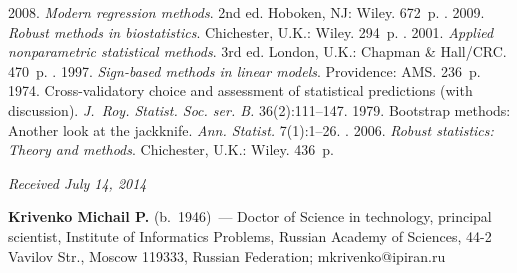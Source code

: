 



\vspace*{9pt}

  \begin{multicols}{2}

\renewcommand{\bibname}{\protect\rmfamily References}



{\small\frenchspacing
{%
\begin{thebibliography}{9}

 2008. \textit{Modern regression methods}. 2nd ed.
Hoboken, NJ: Wiley. 672~p.
.
2009. \textit{Robust methods in biostatistics}. Chichester, U.K.: Wiley. 294~p.
. 2001. \textit{Applied
nonparametric statistical methods}. 3rd ed. London, U.K.: Chapman \& Hall/CRC. 470~p.
. 1997.
\textit{Sign-based methods in linear models}. Providence: AMS. 236~p.
  1974.
Cross-validatory choice and assessment of statistical predictions
(with discussion). \textit{J.~Roy. Statist. Soc. ser. B.} 36(2):111--147.
 1979. Bootstrap methods: Another look at the jackknife.
\textit{Ann. Statist.} 7(1):1--26.
.
2006. \textit{Robust statistics: Theory and methods}. Chichester, U.K.: Wiley. 436~p.


\end{thebibliography}
} }


\end{multicols}

\vspace*{-6pt}

\hfill{\small\textit{Received July 14, 2014}}

\vspace*{-12pt}

\Contrl

\noindent
\textbf{Krivenko Michail P.} (b.\ 1946)~---
Doctor of Science in technology, principal scientist,
Institute of Informatics Problems, Russian Academy of Sciences,
44-2 Vavilov Str., Moscow 119333, Russian Federation;
mkrivenko@ipiran.ru

 \label{end\stat}

\renewcommand{\bibname}{\protect\rm Литература}
